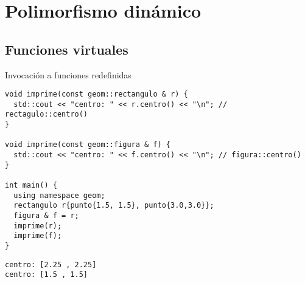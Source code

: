 \section{Polimorfismo dinámico}

\subsection{Funciones virtuales}

\begin{frame}[t,fragile]{Invocación a funciones redefinidas}
\begin{lstlisting}
void imprime(const geom::rectangulo & r) {
  std::cout << "centro: " << r.centro() << "\n"; // rectagulo::centro()
}

void imprime(const geom::figura & f) {
  std::cout << "centro: " << f.centro() << "\n"; // figura::centro()
}

int main() {
  using namespace geom;
  rectangulo r{punto{1.5, 1.5}, punto{3.0,3.0}};
  figura & f = r;
  imprime(r);
  imprime(f);
}
\end{lstlisting}

\begin{lstlisting}[style=terminal]
centro: [2.25 , 2.25]
centro: [1.5 , 1.5]
\end{lstlisting}

\end{frame}

